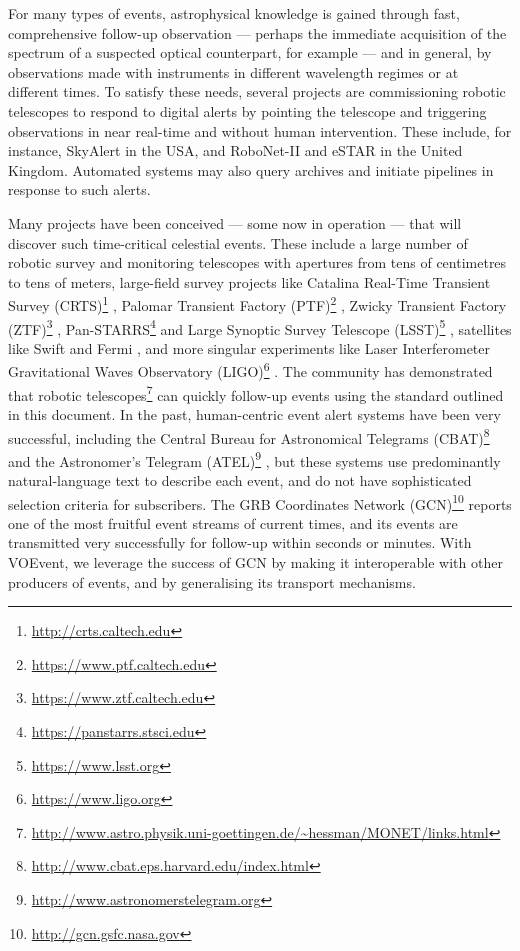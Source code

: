 \documentclass[11pt,a4paper]{ivoa}
\begin{document}
For many types of events, astrophysical knowledge is gained through fast,
comprehensive follow-up observation --- perhaps the immediate acquisition of the
spectrum of a suspected optical counterpart, for example --- and in general, by
observations made with instruments in different wavelength regimes or at
different times. To satisfy these needs, several projects are commissioning
robotic telescopes to respond to digital alerts by pointing the telescope and
triggering observations in near real-time and without human intervention. These
include, for instance, SkyAlert \citep{bib05} in the USA, and RoboNet-II
\citep{bib12} and eSTAR \citep{bib03} in the United Kingdom. Automated systems
may also query archives and initiate pipelines in response to such alerts.

Many projects have been conceived --- some now in operation --- that will
discover such time-critical celestial events. These include a large number of
robotic survey and monitoring telescopes with apertures from tens of centimetres
to tens of meters, large-field survey projects like Catalina Real-Time Transient
Survey (CRTS)\footnote{\url{http://crts.caltech.edu}} \citep{bib08}, Palomar
Transient Factory (PTF)\footnote{\url{https://www.ptf.caltech.edu}}
\citep{bib31}, Zwicky Transient Factory (ZTF)\footnote{
\url{https://www.ztf.caltech.edu}} \citep{2014htu..conf...27B},
Pan-STARRS\footnote{\url{https://panstarrs.stsci.edu}} \citep{bib09} and Large
Synoptic Survey Telescope (LSST)\footnote{\url{https://www.lsst.org}}
\citep{bib07}, satellites like Swift \citep{bib11a} and Fermi \citep{bib11b},
and more singular experiments like Laser Interferometer Gravitational Waves
Observatory (LIGO)\footnote{\url{https://www.ligo.org}} \citep{bib06}. The
community has demonstrated that robotic telescopes\footnote{
\url{http://www.astro.physik.uni-goettingen.de/~hessman/MONET/links.html}} can
quickly follow-up events using the standard outlined in this document. In the
past, human-centric event alert systems have been very successful, including the
Central Bureau for Astronomical Telegrams (CBAT)\footnote{
\url{http://www.cbat.eps.harvard.edu/index.html}} and the Astronomer's Telegram
(ATEL)\footnote{\url{http://www.astronomerstelegram.org}} \citep{bib01}, but
these systems use predominantly natural-language text to describe each event,
and do not have sophisticated selection criteria for subscribers. The GRB
Coordinates Network (GCN)\footnote{\url{http://gcn.gsfc.nasa.gov}} \citep{bib04}
reports one of the most fruitful event streams of current times, and its events
are transmitted very successfully for follow-up within seconds or minutes. With
VOEvent, we leverage the success of GCN by making it interoperable with other
producers of events, and by generalising its transport mechanisms.
\end{document}
